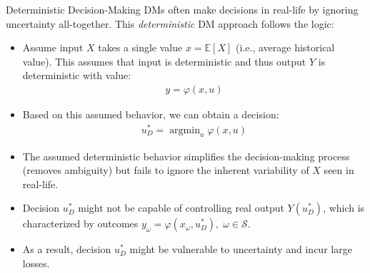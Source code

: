 \documentclass[9pt]{beamer}
\begin{document}
%
\begin{frame}{Deterministic Decision-Making}
DMs often make decisions in real-life by ignoring uncertainty all-together. This {\em deterministic} DM approach follows the logic:
\begin{block}{}
\begin{itemize}
\item Assume input $X$ takes a single value $x={\mathbb{E}}[X]$ (i.e., average historical value). This assumes that input is deterministic and thus output $Y$ is deterministic with value:
\begin{align*}
y=\varphi(x,u)
\end{align*}
\item Based on this assumed behavior, we can obtain a decision: 
\begin{align*}
u_D^*=\mathop{\textrm{argmin}}_{u}\varphi (x,u)
\end{align*}
\end{itemize}
\end{block}
\begin{itemize}
\item The assumed deterministic behavior simplifies the decision-making process (removes ambiguity) but fails to ignore the inherent variability of $X$ seen in real-life. 

\item Decision $u_D^*$ might not be capable of controlling real output $Y(u_D^*)$, which is characterized by outcomes $y_\omega=\varphi(x_\omega,u_D^*),\; \omega \in \mathcal{S}$. 

\item As a result, decision $u_D^*$ might be vulnerable to uncertainty and incur large losses. 
\end{itemize}

\end{frame}
\end{document}

